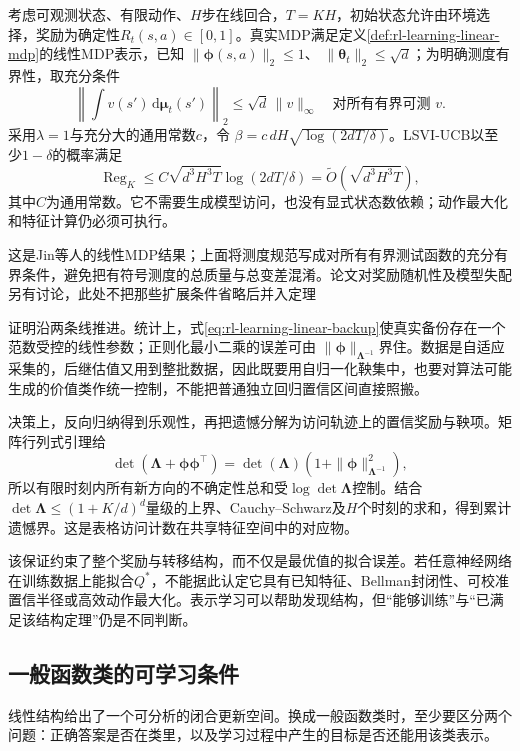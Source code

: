 \begin{theorem}
  \label{thm:rl-learning-lsvi}
  考虑可观测状态、有限动作、$H$步在线回合，$T=KH$，初始状态允许由环境选择，奖励为确定性$R_t(s,a)\in[0,1]$。真实MDP满足定义\ref{def:rl-learning-linear-mdp}的线性MDP表示，已知
  $\|\bm\phi(s,a)\|_2\leq1$、
  $\|\bm\theta_t\|_2\leq\sqrt d$；为明确测度有界性，取充分条件
  \[
    \left\|\int v(s')\,\mathrm d\bm\mu_t(s')\right\|_2
                          \leq\sqrt d\,\|v\|_\infty
        \quad\text{对所有有界可测 }v.
  \]
  采用$\lambda=1$与充分大的通用常数$c$，令
  $\beta=c\,dH\sqrt{\log(2dT/\delta)}$。LSVI-UCB以至少$1-\delta$的概率满足
  \[
    \operatorname{Reg}_K
       \leq C\sqrt{d^3H^3T}\log(2dT/\delta)
       =\widetilde O(\sqrt{d^3H^3T}),
  \]
  其中$C$为通用常数。它不需要生成模型访问，也没有显式状态数依赖；动作最大化和特征计算仍必须可执行。
\end{theorem}

这是Jin等人的线性MDP结果；上面将测度规范写成对所有有界测试函数的充分有界条件，避免把有符号测度的总质量与总变差混淆。论文对奖励随机性及模型失配另有讨论，此处不把那些扩展条件省略后并入定理

证明沿两条线推进。统计上，式\eqref{eq:rl-learning-linear-backup}使真实备份存在一个范数受控的线性参数；正则化最小二乘的误差可由
$\|\bm\phi\|_{\bm\Lambda^{-1}}$界住。数据是自适应采集的，后继估值又用到整批数据，因此既要用自归一化鞅集中，也要对算法可能生成的价值类作统一控制，不能把普通独立回归置信区间直接照搬。

决策上，反向归纳得到乐观性，再把遗憾分解为访问轨迹上的置信奖励与鞅项。矩阵行列式引理给
\[
 \det(\bm\Lambda+\bm\phi\bm\phi^\top)
    =\det(\bm\Lambda)(1+\|\bm\phi\|_{\bm\Lambda^{-1}}^2),
\]
所以有限时刻内所有新方向的不确定性总和受$\log\det\bm\Lambda$控制。结合
$\det\bm\Lambda\leq(1+K/d)^d$量级的上界、Cauchy--Schwarz及$H$个时刻的求和，得到累计遗憾界。这是表格访问计数在共享特征空间中的对应物。

该保证约束了整个奖励与转移结构，而不仅是最优值的拟合误差。若任意神经网络在训练数据上能拟合$Q^*$，不能据此认定它具有已知特征、Bellman封闭性、可校准置信半径或高效动作最大化。表示学习可以帮助发现结构，但“能够训练”与“已满足该结构定理”仍是不同判断。

\subsection{一般函数类的可学习条件}
\label{sec:rl-learning-function-classes}

线性结构给出了一个可分析的闭合更新空间。换成一般函数类时，至少要区分两个问题：正确答案是否在类里，以及学习过程中产生的目标是否还能用该类表示。

